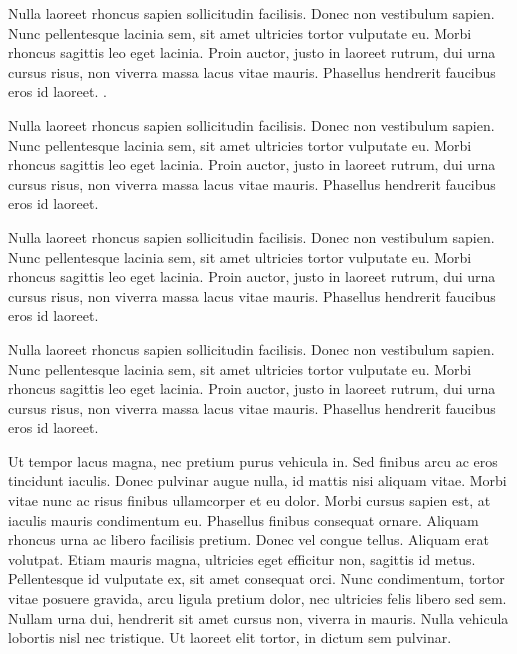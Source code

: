 Nulla laoreet rhoncus sapien sollicitudin facilisis. Donec non vestibulum sapien. Nunc pellentesque lacinia sem, sit amet ultricies tortor vulputate eu. Morbi rhoncus sagittis leo eget lacinia. Proin auctor, justo in laoreet rutrum, dui urna cursus risus, non viverra massa lacus vitae mauris. Phasellus hendrerit faucibus eros id laoreet.  . 

\citet[p.84]{CIP2006} 
\begin{displayquote}
Nulla laoreet rhoncus sapien sollicitudin facilisis. Donec non vestibulum sapien. Nunc pellentesque lacinia sem, sit amet ultricies tortor vulputate eu. Morbi rhoncus sagittis leo eget lacinia. Proin auctor, justo in laoreet rutrum, dui urna cursus risus, non viverra massa lacus vitae mauris. Phasellus hendrerit faucibus eros id laoreet.  	
\end{displayquote}
Nulla laoreet rhoncus sapien sollicitudin facilisis. Donec non vestibulum sapien. Nunc pellentesque lacinia sem, sit amet ultricies tortor vulputate eu. Morbi rhoncus sagittis leo eget lacinia. Proin auctor, justo in laoreet rutrum, dui urna cursus risus, non viverra massa lacus vitae mauris. Phasellus hendrerit faucibus eros id laoreet.   

Nulla laoreet rhoncus sapien sollicitudin facilisis. Donec non vestibulum sapien. Nunc pellentesque lacinia sem, sit amet ultricies tortor vulputate eu. Morbi rhoncus sagittis leo eget lacinia. Proin auctor, justo in laoreet rutrum, dui urna cursus risus, non viverra massa lacus vitae mauris. Phasellus hendrerit faucibus eros id laoreet.   

Ut tempor lacus magna, nec pretium purus vehicula in. Sed finibus arcu ac eros tincidunt iaculis. Donec pulvinar augue nulla, id mattis nisi aliquam vitae. Morbi vitae nunc ac risus finibus ullamcorper et eu dolor. Morbi cursus sapien est, at iaculis mauris condimentum eu. Phasellus finibus consequat ornare. Aliquam rhoncus urna ac libero facilisis pretium. Donec vel congue tellus. Aliquam erat volutpat. Etiam mauris magna, ultricies eget efficitur non, sagittis id metus. Pellentesque id vulputate ex, sit amet consequat orci. Nunc condimentum, tortor vitae posuere gravida, arcu ligula pretium dolor, nec ultricies felis libero sed sem. Nullam urna dui, hendrerit sit amet cursus non, viverra in mauris. Nulla vehicula lobortis nisl nec tristique. Ut laoreet elit tortor, in dictum sem pulvinar. 



